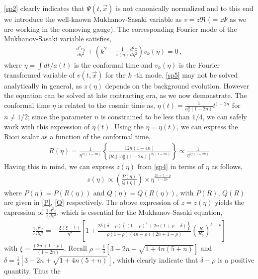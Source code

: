 \documentclass{article}
\begin{document}
\ref{sp2} clearly indicates that $\Psi(t,\vec{x})$ is not
canonically normalized and to this end we introduce the well-known
Mukhanov-Sasaki variable as $v = z\Re$ ($= z\Psi$ as we are
working in the comoving gauge). The corresponding Fourier mode of
the Mukhanov-Sasaki variable satisfies,
\begin{align}
\frac{d^2v_k}{d\eta^2} + \left(k^2 - \frac{1}{z(\eta)}\frac{d^2z}{d\eta^2}\right)v_k(\eta)
= 0 \, ,
\label{sp5}
\end{align}
where $\eta = \int dt/a(t)$ is the conformal time and $v_k(\eta)$
is the Fourier transformed variable of $v(t,\vec{x})$ for the
$k$ -th mode. \ref{sp5} may not be solved analytically in general, as $z(\eta)$ depends on the background evolution. However the equation 
can be solved at late contracting era, as we now demonstrate. The conformal time $\eta$ is related to the cosmic time as, 
$\eta(t) = \frac{1}{a_0^n\left(1-2n\right)}t^{1-2n}$ for $n \neq 1/2$; since the parameter $n$ is constrained to be less than $1/4$, we can safely 
work with this expression of $\eta(t)$. Using the $\eta = \eta(t)$, we can express the Ricci scalar as a
function of the conformal time,
\begin{eqnarray}
R(\eta) = \frac{1}{\eta^{2/(1-2n)}}\left\{\frac{12n(1-4n)}{|R_0|\left[a_0^n(1-2n)\right]^{2/(1-2n)}}\right\} \propto \frac{1}{\eta^{2/(1-2n)}}
\label{sp6}
\end{eqnarray}
Having this in mind, we can express $z(\eta)$ from \ref{sp4} in terms of $\eta$ as follows,
\begin{align}
z(\eta) \propto \left(\frac{P(\eta)}{Q(\eta)}\right)\times\eta^{\frac{2n+1-\rho}{1-2n}}
\label{sp67}
\end{align}
where $P(\eta) = P(R(\eta))$ and $Q(\eta) = Q(R(\eta))$, with $P(R)$, $Q(R)$ are given in \ref{P}, \ref{Q} respectively. The 
above expression of $z = z(\eta)$ yields the expression of $\frac{1}{z}\frac{d^2z}{d\eta^2}$, which is essential for the Mukhanov-Sasaki equation,
\begin{align}
\frac{1}{z}\frac{d^2z}{d\eta^2}=&\frac{\xi(\xi-1)}{\eta^2}
\left[1 + \frac{2\delta(\delta-\rho)\left\{(1-\rho)^2 + 2n(1+\rho-\delta)\right\}}
{\rho(1-\rho)(4n-\rho)(2n+1-\rho)}\left(\frac{R}{R_0}\right)^{\delta-\rho}\right]
\label{sp7}
\end{align}
with $\xi = \frac{(2n+1-\rho)}{(1-2n)}$. Recall $\rho = \frac{1}{4}\left[3 - 2n - \sqrt{1 + 4n(5+n)}\right]$ and 
$\delta = \frac{1}{4}\left[3 - 2n + \sqrt{1 + 4n(5+n)}\right]$, which clearly indicate that $\delta - \rho$ is a positive quantity. Thus the 
\end{document}
